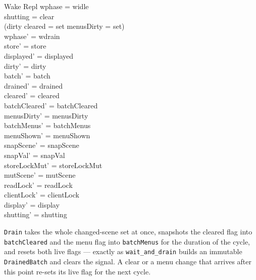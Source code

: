 \documentclass[a4paper,10pt,fleqn]{article}
\begin{document}
\begin{schema}{Wake}
  \Delta Repl
\where
  wphase = widle \\
  shutting = clear \\
  (dirty \neq \emptyset \lor cleared = set \lor menusDirty = set) \\
  wphase' = wdrain \\
  store' = store \\
  displayed' = displayed \\
  dirty' = dirty \\
  batch' = batch \\
  drained' = drained \\
  cleared' = cleared \\
  batchCleared' = batchCleared \\
  menusDirty' = menusDirty \\
  batchMenus' = batchMenus \\
  menuShown' = menuShown \\
  snapScene' = snapScene \\
  snapVal' = snapVal \\
  storeLockMut' = storeLockMut \\
  mutScene' = mutScene \\
  readLock' = readLock \\
  clientLock' = clientLock \\
  display' = display \\
  shutting' = shutting
\end{schema}

\texttt{Drain} takes the whole changed-scene set at once, snapshots the
cleared flag into \texttt{batchCleared} and the menu flag into
\texttt{batchMenus} for the duration of the cycle, and resets both live flags
--- exactly as \texttt{wait\_and\_drain} builds an immutable
\texttt{DrainedBatch} and clears the signal.  A clear or a menu change that
arrives after this point re-sets its live flag for the next cycle.
\end{document}
